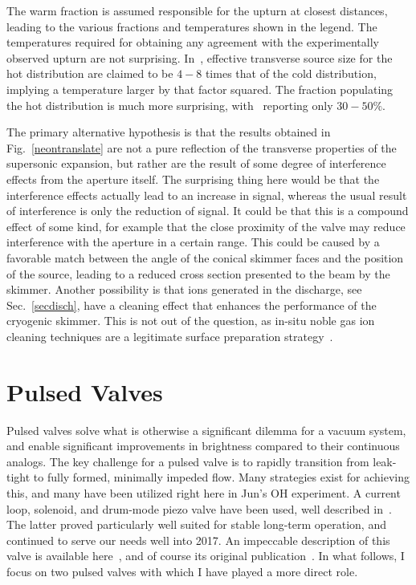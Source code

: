 The warm fraction is assumed responsible for the upturn at closest distances, leading to the various fractions and temperatures shown in the legend.
The temperatures required for obtaining any agreement with the experimentally observed upturn are not surprising.
In~\citep[Abstract, 3rd Paragraph]{beijerinck1981}, effective transverse source size for the hot distribution are claimed to be $4-8$ times that of the cold distribution, implying a temperature larger by that factor squared.
The fraction populating the hot distribution is much more surprising, with~\cite{beijerinck1981} reporting only $30-50\%$.

The primary alternative hypothesis is that the results obtained in Fig.~\ref{neontranslate} are not a pure reflection of the transverse properties of the supersonic expansion, but rather are the result of some degree of interference effects from the aperture itself.
The surprising thing here would be that the interference effects actually lead to an increase in signal, whereas the usual result of interference is only the reduction of signal.
It could be that this is a compound effect of some kind, for example that the close proximity of the valve may reduce interference with the aperture in a certain range. 
This could be caused by a favorable match between the angle of the conical skimmer faces and the position of the source, leading to a reduced cross section presented to the beam by the skimmer.
Another possibility is that ions generated in the discharge, see Sec.~\ref{secdisch}, have a cleaning effect that enhances the performance of the cryogenic skimmer.
This is not out of the question, as in-situ noble gas ion cleaning techniques are a legitimate surface preparation strategy~\cite{Hite2012}.

\section{Pulsed Valves}

Pulsed valves solve what is otherwise a significant dilemma for a vacuum system, and enable significant improvements in brightness compared to their continuous analogs.
The key challenge for a pulsed valve is to rapidly transition from leak-tight to fully formed, minimally impeded flow.
Many strategies exist for achieving this, and many have been utilized right here in Jun's OH experiment.
A current loop, solenoid, and drum-mode piezo valve have been used, well described in~\cite[Sec.~3.1.3.1-3]{SawyerThesis2010}.
The latter proved particularly well suited for stable long-term operation, and continued to serve our needs well into 2017.
An impeccable  description of this valve is available here~\citep[Sec.~3.4.1.1]{BrilesThesis2015}, and of course its original publication~\cite{Proch1989}.
In what follows, I focus on two pulsed valves with which I have played a more direct role.

